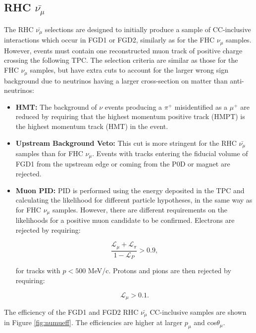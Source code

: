 \subsection{RHC $\bar{\nu_{\mu}}$}

The RHC $\bar{\nu_{\mu}}$ selections are designed to initially produce a sample of CC-inclusive interactions which occur in FGD1 or FGD2, similarly as for the FHC $\nu_{\mu}$ samples. However, events must contain one reconstructed muon track of positive charge crossing the following TPC. The selection criteria are similar as those for the FHC $\nu_{\mu}$ samples, but have extra cuts to account for the larger wrong sign background due to neutrinos having a larger cross-section on matter than anti-neutrinos:

\begin{itemize}

\item \textbf{HMT:} The background of $\nu$ events producing a $\pi^+$ misidentified as a $\mu^+$ are reduced by requiring that the highest momentum positive track (HMPT) is the highest momentum track (HMT) in the event.

\item \textbf{Upstream Background Veto:} This cut is more stringent for the RHC $\bar{\nu_{\mu}}$ samples than for FHC $\nu_{\mu}$. Events with tracks entering the fiducial volume of FGD1 from the upstream edge or coming from the P0D or magnet are rejected.

\item \textbf{Muon PID:} PID is performed using the energy deposited in the TPC and calculating the likelihood for different particle hypotheses, in the same way as for FHC $\nu_{\mu}$ samples. However, there are different requirements on the likelihoods for a positive muon candidate to be confirmed. Electrons are rejected by requiring:

\begin{equation}
\frac{\mathcal{L}_{\mu}+\mathcal{L}_{\pi}}{1-\mathcal{L}_P} > 0.9,
\end{equation}

for tracks with  $p < 500$ MeV/c. Protons and pions are then rejected by requiring:

\begin{equation}
\mathcal{L}_{\mu} > 0.1.
\end{equation}

\end{itemize}

The efficiency of the FGD1 and FGD2 RHC $\bar{\nu_{\mu}}$ CC-inclusive samples are shown in Figure \ref{fig:numueff}.  The efficiencies are higher at larger $p_{\mu}$ and cos$\theta_{\mu}$. 

